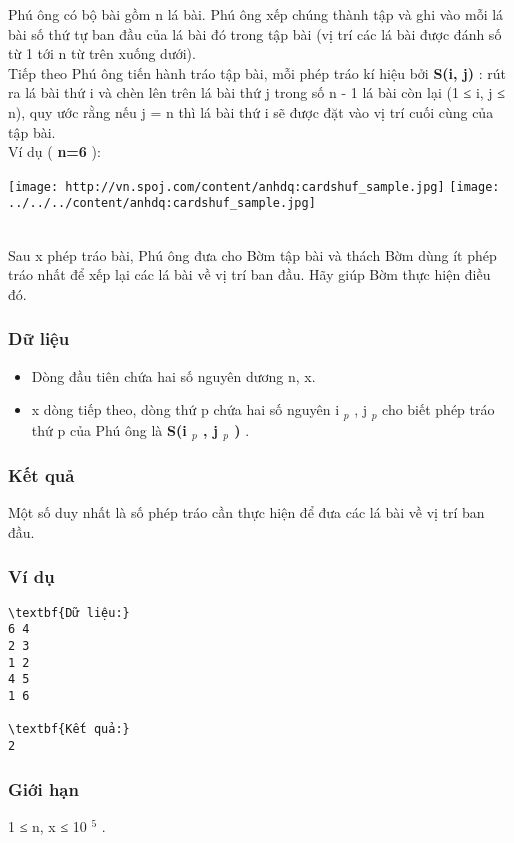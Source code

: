 

Phú ông có bộ bài gồm n lá bài. Phú ông xếp chúng thành tập và ghi vào mỗi lá bài số thứ tự ban đầu của lá bài đó trong tập bài (vị trí các lá bài được đánh số từ 1 tới n từ trên xuống dưới).
\\Tiếp theo Phú ông tiến hành tráo tập bài, mỗi phép tráo kí hiệu bởi \textbf{ S(i, j) } : rút ra lá bài thứ i và chèn lên trên lá bài thứ j trong số n - 1 lá bài còn lại (1 ≤ i, j ≤ n), quy ước rằng nếu j = n thì lá bài thứ i sẽ được đặt vào vị trí cuối cùng của tập bài.
\\Ví dụ ( \textbf{ n=6 } ):


\texttt{[image: http://vn.spoj.com/content/anhdq:cardshuf\_sample.jpg]}
\texttt{[image: ../../../content/anhdq:cardshuf\_sample.jpg]}


\\Sau x phép tráo bài, Phú ông đưa cho Bờm tập bài và thách Bờm dùng ít phép tráo nhất để xếp lại các lá bài về vị trí ban đầu. Hãy giúp Bờm thực hiện điều đó.

\subsubsection{Dữ liệu}
\begin{itemize}
	\item Dòng đầu tiên chứa hai số nguyên dương n, x.
	\item x dòng tiếp theo, dòng thứ p chứa hai số nguyên i $_ p $ , j $_ p $ cho biết phép tráo thứ p của Phú ông là \textbf{ S(i $_ p $ , j $_ p $ ) } .
\end{itemize}

\subsubsection{Kết quả}

Một số duy nhất là số phép tráo cần thực hiện để đưa các lá bài về vị trí ban đầu.

\subsubsection{Ví dụ}
\begin{verbatim}
\textbf{Dữ liệu:}
6 4
2 3
1 2
4 5
1 6

\textbf{Kết quả:}
2
\end{verbatim}

\subsubsection{Giới hạn}

1 ≤ n, x ≤ 10 $^ 5 $ .